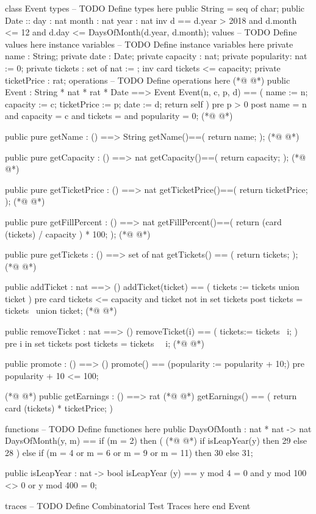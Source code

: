 \begin{vdmpp}[breaklines=true]
class Event
types
-- TODO Define types here
  public String = seq of char;
  public Date :: day : nat
          month : nat
          year : nat
  inv d == d.year > 2018 and 
    d.month <= 12 and
    d.day <=  DaysOfMonth(d.year, d.month);
values
-- TODO Define values here
instance variables
-- TODO Define instance variables here
 private name : String;
 private date : Date;
 private capacity : nat;
 private popularity: nat := 0;
 private tickets : set of nat := {};
  inv card tickets <= capacity;
 private ticketPrice : rat;
operations
-- TODO Define operations here
(*@
\label{Event:24}
@*)
 public Event : String * nat * rat * Date ==> Event
 Event(n, c, p, d) == (
  name := n; 
  capacity := c; 
  ticketPrice := p;
  date := d; 
  return self
 )
 pre p > 0
 post name = n and capacity = c and tickets = {} and popularity = 0;
(*@
\label{getName:34}
@*)
    
 public pure getName : () ==> String
 getName()==(
  return name;
 );
(*@
\label{getCapacity:39}
@*)
 
 public pure getCapacity : () ==> nat
 getCapacity()==(
  return capacity;
 );
(*@
\label{getTicketPrice:44}
@*)
 
 public pure getTicketPrice : () ==> nat
 getTicketPrice()==(
  return ticketPrice;
 );
(*@
\label{getFillPercent:49}
@*)
 
 public pure getFillPercent : () ==> nat
 getFillPercent()==(
  return (card (tickets) / capacity ) * 100;
 );
(*@
\label{getTickets:54}
@*)
 
 public pure getTickets : () ==> set of nat
 getTickets() == (
  return tickets;
 );
(*@
\label{addTicket:59}
@*)
 
 public addTicket : nat ==> ()
 addTicket(ticket) == (
  tickets := tickets union {ticket}
 )
 pre card tickets <= capacity and ticket not in set tickets
 post tickets = tickets~ union {ticket};
(*@
\label{removeTicket:66}
@*)
 
 public removeTicket : nat ==> ()
 removeTicket(i) == (
  tickets:= tickets \ {i}; 
 )
 pre i in set tickets
 post tickets = tickets~ \ {i}; 
(*@
\label{promote:73}
@*)
 
 public promote : () ==> ()
 promote() == (popularity := popularity + 10;)
 pre popularity + 10 <= 100;
 
(*@
\label{getEarnings:78}
@*)
 public getEarnings : () ==> rat
(*@
\label{DaysOfMonth:79}
@*)
 getEarnings() == (
  return card (tickets) * ticketPrice; 
 )
 
functions
-- TODO Define functiones here
 public DaysOfMonth : nat * nat -> nat
 DaysOfMonth(y, m) == 
  if (m = 2) then (
(*@
\label{isLeapYear:88}
@*)
   if isLeapYear(y) then 29
   else 28
  )
  else if (m = 4 or m = 6 or m = 9 or m = 11) then 30
  else 31;
 
 public isLeapYear : nat -> bool
 isLeapYear (y) ==
  y mod 4 = 0 and y mod 100 <> 0 or y mod 400 = 0;
  
traces
-- TODO Define Combinatorial Test Traces here
end Event
\end{vdmpp}
